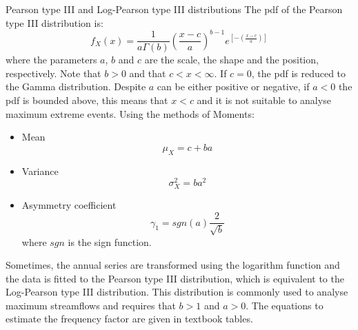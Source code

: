 \documentclass[8pt]{beamer}
\renewcommand{\emph}[1]{\textcolor{myorange}{#1}}
\begin{document}
\begin{frame}{Pearson type III and Log-Pearson type III distributions}
    The \emph{pdf} of the \alert{Pearson type III distribution} is:
    \[
        f_X (x) = \frac{1}{a \Gamma (b)} \left( \frac{x-c}{a} \right)^{b-1} e^{\left[ - \left( \frac{x-c}{a} \right) \right]}
        \]
        where the parameters $a$, $b$ and $c$ are the scale, the shape and the position, respectively. Note that $b>0$ and that $c < x < \infty$. If $c = 0$, the \emph{pdf} is reduced to the \emph{Gamma distribution}. Despite $a$ can be either positive or negative, if $a<0$ the \emph{pdf} is bounded above, this means that $x < c$ and it is not suitable to analyse maximum extreme events. Using the \emph{methods of Moments}:
        \begin{itemize}
            \item \emph{Mean}
                \[
                    \mu_X = c + ba
                \]

            \item \emph{Variance}
                \[
                    \sigma_X^2 = ba^2
                \]
            \item \emph{Asymmetry coefficient}
                \[
                    \gamma_1 = sgn(a) \frac{2}{\sqrt{b}}
                \]
                where $sgn$ is the sign function.
        \end{itemize}
        Sometimes, the annual series are transformed using the logarithm function and the data is fitted to the \emph{Pearson type III distribution}, which is equivalent to the \alert{Log-Pearson type III distribution}. This distribution is commonly used to analyse maximum streamflows and requires that $b>1$ and $a>0$. The equations to estimate the frequency factor are given in textbook tables. 

\end{frame}
\end{document}
